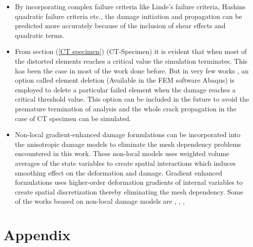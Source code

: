 \documentclass[12pt,a4paper,twoside,openright]{report}
\let\tmp\oddsidemargin
\let\oddsidemargin\evensidemargin
\let\evensidemargin\tmp
\begin{document}
\begin{itemize}
\item By incorporating complex failure criteria like Linde's failure criteria, Hashins quadratic failure criteria \citep{jiang2018evaluations} etc., the damage initiation and propagation can be predicted more accurately because of the inclusion of shear effects and quadratic terms.

\item From section (\ref{CT specimen}) (CT-Specimen) it is evident that when most of the distorted elements reaches a critical value the simulation terminates. This has been the case in most of the work done before. But in very few works \citep{jiang2018evaluations}, \citep{sokolinsky2011numerical} an option called element deletion (Available in the FEM software Abaqus) is employed to delete a particular failed element when the damage reaches a critical threshold value. This option can be included in the future to avoid the premature termination of analysis and the whole crack propagation in the case of CT specimen can be simulated. 
\item Non-local gradient-enhanced damage formulations can be incorporated into the anisotropic damage models to eliminate the mesh dependency problems encountered in this work.  These non-local models uses weighted volume averages of the state variables to create spatial interactions which induces smoothing effect on the deformation and damage.  Gradient enhanced formulations uses higher-order deformation gradients of internal variables to create spatial discretization thereby eliminating the mesh dependency. Some of the works beased on non-local damage models are \citep{peerlings1999enhanced}, \citep{fassin2019gradient}, \citep{geers1998experimental}, \citep{seupel2018efficient}

\end{itemize}





\newpage




\clearpage
\thispagestyle{empty}
\hfill
\clearpage
	\let\tmp\oddsidemargin
	\let\oddsidemargin\evensidemargin
	\let\evensidemargin\tmp
	\reversemarginpar
{}
\chapter*{Appendix}
\end{document}
